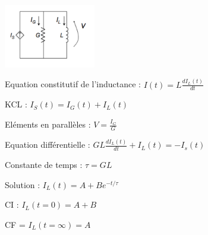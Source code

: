 \documentclass[11pt]{report}
\begin{document}
\begin{framed}
  \includegraphics[width=4cm]{10.png}\newline

   Equation constitutif de l'inductance :  $I(t) = L\frac{dI_L(t)}{dt}$\newline

   KCL : $I_S(t) = I_G(t) + I_L(t)$ \newline

   Eléments en parallèles : $V = \frac{I_G}{G}$\newline

   Equation différentielle : $GL\frac{dI_L(t)}{dt} + I_L(t) = -I_s(t)$\newline

   Constante de temps : $\tau = GL$\newline

   Solution : $I_L(t) = A + Be^{-t/\tau}$\newline

   CI : $I_L(t=0) = A + B$\newline

   CF = $I_L(t=\infty) = A$\newline

\end{framed}
\end{document}
